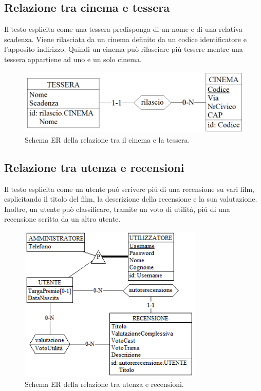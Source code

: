 \documentclass[a4paper,12pt]{report}
\begin{document}
	\subsection{Relazione tra cinema e tessera}
	Il testo esplicita come una tessera predisponga di un nome e di una relativa scadenza. Viene rilasciata da un cinema definito da un codice identificatore e l'apposito indirizzo. Quindi un cinema può rilasciare più tessere mentre una tessera appartiene ad uno e un solo cinema. 
	\begin{figure}[H]
		\centering
		\includegraphics[width=0.7\linewidth]{ER/cinetessera.png}
		\caption{Schema ER della relazione tra il cinema e la tessera.}
	\end{figure}
	\subsection{Relazione tra utenza e recensioni}
	Il testo esplicita come un utente può scrivere piú di una recensione su vari film, esplicitando il titolo del film, la descrizione della recensione e la sua valutazione. Inoltre, un utente può classificare, tramite un voto di utilitá, piú di una recensione scritta da un altro utente.
	\begin{figure}[H]
		\centering
		\includegraphics[width=250pt]{ER/utenzarecensione.png}
		\caption{Schema ER della relazione tra utenza e recensioni.}
	\end{figure}
\end{document}
